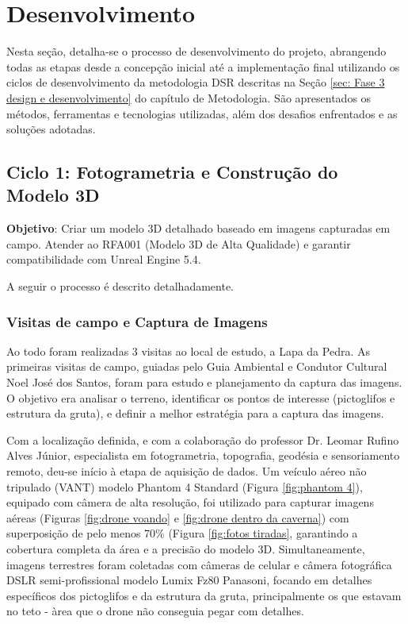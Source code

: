 \chapter{Desenvolvimento}
\label{cap:desenvolvimento}

Nesta seção, detalha-se o processo de desenvolvimento do projeto, abrangendo todas as etapas desde a concepção inicial até a implementação final utilizando os ciclos de desenvolvimento da metodologia DSR descritas na Seção \ref{sec: Fase 3 design e desenvolvimento} do capítulo de Metodologia. São apresentados os métodos, ferramentas e tecnologias utilizadas, além dos desafios enfrentados e as soluções adotadas.


\section{Ciclo 1: Fotogrametria e Construção do Modelo 3D}
\label{sec:ciclo1_fotogrametria}

\textbf{Objetivo}: Criar um modelo 3D detalhado baseado em imagens capturadas em campo. Atender ao RFA001 (Modelo 3D de Alta Qualidade) e garantir compatibilidade com Unreal Engine 5.4. 

A seguir o processo é descrito detalhadamente.
    \subsection{Visitas de campo e Captura de Imagens} 
    Ao todo foram realizadas 3 visitas ao local de estudo, a Lapa da Pedra. 
    As primeiras visitas de campo, guiadas pelo Guia Ambiental e Condutor Cultural Noel José dos Santos, foram para estudo e planejamento da captura das imagens. O objetivo era analisar o terreno, identificar os pontos de interesse (pictoglifos e estrutura da gruta), e definir a melhor estratégia para a captura das imagens.

    Com a localização definida, e com a colaboração do professor Dr. Leomar Rufino Alves Júnior, especialista em fotogrametria, topografia, geodésia e sensoriamento remoto, deu-se início à etapa de aquisição de dados. Um veículo aéreo não tripulado (VANT) modelo Phantom 4 Standard (Figura \ref{fig:phantom 4}), equipado com câmera de alta resolução, foi utilizado para capturar imagens aéreas (Figuras \ref{fig:drone voando} e \ref{fig:drone dentro da caverna}) com superposição de pelo menos 70\% (Figura \ref{fig:fotos tiradas}, garantindo a cobertura completa da área e a precisão do modelo 3D. Simultaneamente, imagens terrestres foram coletadas com câmeras de celular e câmera fotográfica DSLR semi-profissional modelo Lumix Fz80 Panasoni, focando em detalhes específicos dos pictoglifos e da estrutura da gruta, principalmente os que estavam no teto - àrea que o drone não conseguia pegar com detalhes.

